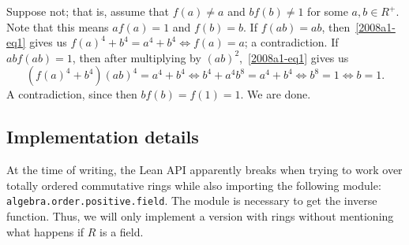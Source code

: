\documentclass{article}
\begin{document}
Suppose not; that is, assume that $f(a) \neq a$ and $b f(b) \neq 1$ for some $a, b \in R^+$.
Note that this means $a f(a) = 1$ and $f(b) = b$.
If $f(ab) = ab$, then~\eqref{2008a1-eq1} gives us $f(a)^4 + b^4 = a^4 + b^4 \iff f(a) = a$; a contradiction.
If $ab f(ab) = 1$, then after multiplying by $(ab)^2$,~\eqref{2008a1-eq1} gives us 
\[ (f(a)^4 + b^4) (ab)^4 = a^4 + b^4 \iff b^4 + a^4 b^8 = a^4 + b^4 \iff b^8 = 1 \iff b = 1. \]
A contradiction, since then $b f(b) = f(1) = 1$.
We are done.



\subsection*{Implementation details}

At the time of writing, the Lean API apparently breaks when trying to work over totally ordered commutative rings while also importing the following module: \texttt{algebra.order.positive.field}.
The module is necessary to get the inverse function.
Thus, we will only implement a version with rings without mentioning what happens if $R$ is a field.
\end{document}
